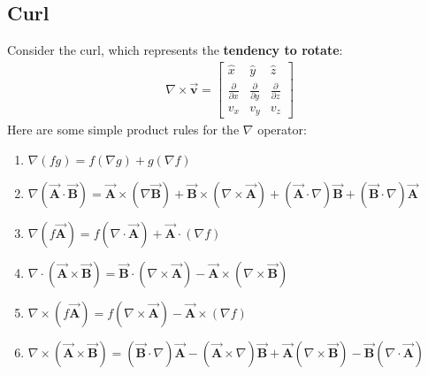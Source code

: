 \documentclass[10pt,oneside]{book}
\newcommand{\vA}{\vec{\mathbf{A}}}
\newcommand{\vB}{\vec{\mathbf{B}}}
\newcommand{\vv}{\vec{\mathbf{v}}}
\newcommand{\prt}[2]{\frac{\partial#1}{\partial#2}}
\begin{document}
\subsection*{Curl}
Consider the curl, which represents the \textbf{tendency to rotate}:
\begin{align*}
  \nabla\times \vv = \begin{bmatrix}
    \hat x& \hat y&\hat z\\\prt{}x&\prt{}y&\prt{}z\\v_x&v_y&v_z
  \end{bmatrix}
\end{align*}
\newcommand{\del}{\nabla}
Here are some simple product rules for the $\nabla$ operator:
\begin{enumerate}[itemsep=1pt]
  \item $\nabla(fg) = f(\nabla g) + g(\nabla f)$
  \item $\nabla(\vA \cdot \vB)= \vA\times(\nabla\vB)+\vB\times(\nabla\times\vA)+(\vA\cdot\nabla)\vB+(\vB\cdot\nabla)\vA$
  \item $\nabla(f\vA)=f(\nabla\cdot \vA)+\vA\cdot(\nabla f)$
  \item $\del\cdot(\vA\times\vB)=\vB\cdot(\del\times\vA)-\vA\times(\nabla\times\vB)$
  \item $\del\times(f\vA)=f(\nabla\times\vA)-\vA\times(\del f)$
  \item $\del\times(\vA\times\vB)=(\vB\cdot\del)\vA-(\vA\times\del)\vB+\vA(\del\times\vB)-\vB(\del\cdot\vA)$
\end{enumerate}
\end{document}
